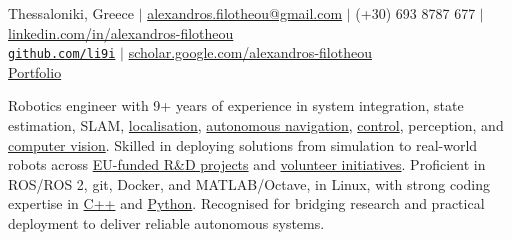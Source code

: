 \documentclass[a4paper,10pt,twoside]{article}
\begin{document}

\par{\bigskip\par}

\begin{center}
  {\footnotesize Thessaloniki, Greece $|$ \href{mailto:alexandros.filotheou@gmail.com}{alexandros.filotheou@gmail.com} $|$ (+30) 693 8787 677 $|$ \href{https://www.linkedin.com/in/alexandros-filotheou-5b6a8676/}{linkedin.com/in/alexandros-filotheou} \\ \href{https://github.com/li9i/}{\texttt{github.com/li9i}} $|$  \href{https://scholar.google.com/citations?hl=en&user=9_hI4hMAAAAJ&view_op=list_works}{scholar.google.com/alexandros-filotheou} \\ \href{https://mozilla.github.io/pdf.js/web/viewer.html?file=https://raw.githubusercontent.com/li9i/portfolio/master/portfolio.pdf}{Portfolio} \\}\vspace{1em}
\end{center}

\vspace{-3em}
\begin{bw_box} \small
  Robotics engineer with 9+ years of experience in system integration, state estimation, SLAM, \href{https://github.com/li9i/fsm-lo}{localisation}, \href{https://link.springer.com/article/10.1007/s10846-019-01086-y}{autonomous navigation}, \href{https://www.tandfonline.com/doi/full/10.1080/00207179.2018.1514129}{control}, perception, and \href{https://github.com/li9i/pandora\_vision\_2014}{computer vision}. Skilled in deploying solutions from simulation to real-world robots across \href{https://www.robetarme-project.eu/}{EU-funded R\&D projects} and \href{https://issel.ee.auth.gr/pandora-robotics/}{volunteer initiatives}. Proficient in ROS/ROS 2, git, Docker, and MATLAB/Octave, in Linux, with strong coding expertise in \href{https://github.com/li9i/fsm}{C++} and \href{https://github.com/cultureid-auth-ros-packages/cultureid-waypoints-following}{Python}. Recognised for bridging research and practical deployment to deliver reliable autonomous systems.
\end{bw_box}
\end{document}
